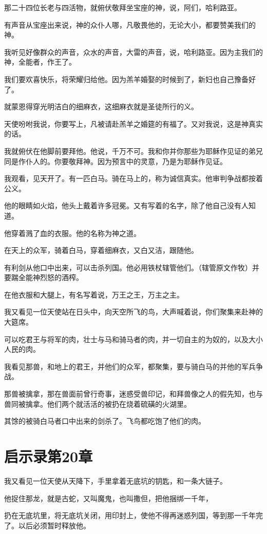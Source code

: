 \documentclass[12pt,oneside]{book}
\begin{document}
那二十四位长老与四活物，就俯伏敬拜坐宝座的神，说，阿们，哈利路亚。

有声音从宝座出来说，神的众仆人哪，凡敬畏他的，无论大小，都要赞美我们的神。

我听见好像群众的声音，众水的声音，大雷的声音，说，哈利路亚。因为主我们的神，全能者，作王了。

我们要欢喜快乐，将荣耀归给他。因为羔羊婚娶的时候到了，新妇也自己豫备好了。

就蒙恩得穿光明洁白的细麻衣，这细麻衣就是圣徒所行的义。

天使吩咐我说，你要写上，凡被请赴羔羊之婚筵的有福了。又对我说，这是神真实的话。

我就俯伏在他脚前要拜他。他说，千万不可。我和你并你那些为耶稣作见证的弟兄同是作仆人的。你要敬拜神。因为预言中的灵意，乃是为耶稣作见证。

我观看，见天开了。有一匹白马。骑在马上的，称为诚信真实。他审判争战都按着公义。

他的眼睛如火焰，他头上戴着许多冠冕。又有写着的名字，除了他自己没有人知道。

他穿着溅了血的衣服。他的名称为神之道。

在天上的众军，骑着白马，穿着细麻衣，又白又洁，跟随他。

有利剑从他口中出来，可以击杀列国。他必用铁杖辖管他们。（辖管原文作牧）并要踹全能神烈怒的酒榨。

在他衣服和大腿上，有名写着说，万王之王，万主之主。

我又看见一位天使站在日头中，向天空所飞的鸟，大声喊着说，你们聚集来赴神的大筵席。

可以吃君王与将军的肉，壮士与马和骑马者的肉，并一切自主的为奴的，以及大小人民的肉。

我看见那兽，和地上的君王，并他们的众军，都聚集，要与骑白马的并他的军兵争战。

那兽被擒拿，那在兽面前曾行奇事，迷惑受兽印记，和拜兽像之人的假先知，也与兽同被擒拿。他们两个就活活的被扔在烧着硫磺的火湖里。

其馀的被骑白马者口中出来的剑杀了。飞鸟都吃饱了他们的肉。

\chapter{启示录第20章}
我又看见一位天使从天降下，手里拿着无底坑的钥匙，和一条大链子。

他捉住那龙，就是古蛇，又叫魔鬼，也叫撒但，把他捆绑一千年，

扔在无底坑里，将无底坑关闭，用印封上，使他不得再迷惑列国，等到那一千年完了。以后必须暂时释放他。
\end{document}
